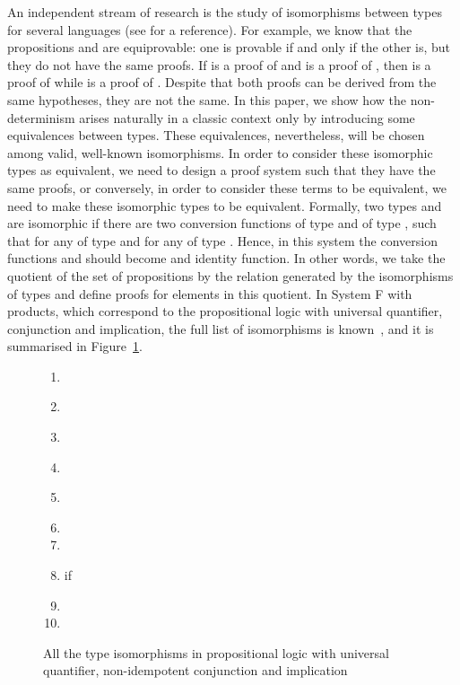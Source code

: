 \documentclass[final,copyright,creativecommons]{eptcs}
\theoremstyle{definition}
\begin{document}
An independent stream of research is the study of isomorphisms between types for several languages (see \cite{DiCosmo95} for a reference).
For example, we know that the propositions  and  are equiprovable: one is provable if and only if the other is, but they do not have the same proofs. If  is a proof of  and  is a proof of , then  is a proof of  while  is a proof of . Despite that both proofs can be derived from the same hypotheses, they are not the same.
In this paper, we show how the non-determinism arises naturally in a classic context only by introducing some equivalences between types. These equivalences, nevertheless, will be chosen among valid, well-known isomorphisms.
In order to consider these isomorphic types as equivalent, we need to design a proof system such that they have the same proofs, or conversely, in order to consider these terms to be equivalent, we need to make these isomorphic types to be equivalent. Formally, two types  and  are isomorphic if there are two conversion functions  of type  and  of type , such that  for any  of type  and  for any  of type .
Hence, in this system the conversion functions  and  should become and identity function. In other words, we take the quotient of the set of propositions by the relation generated by the isomorphisms of types and define proofs for elements in this quotient. In System F with products, which correspond to the propositional logic with universal quantifier, conjunction and implication, the full list of isomorphisms is known~\cite{DiCosmo95}, and it is summarised in Figure~\ref{fig:iso}.
\begin{figure}[!h]
\begin{multicols}{2}
 \begin{enumerate}
  \item\label{iso:comm} 
  \item\label{iso:asso} 
  \item\label{iso:distrib} 
  \item\label{iso:currying} 
  \item\label{iso:ordering} 
  \item 
  \item 
  \item  if 
  \item 
  \item 
 \end{enumerate}
\end{multicols}
 \caption{All the type isomorphisms in propositional logic with universal quantifier, non-idempotent conjunction and implication}
 \label{fig:iso}
\end{figure}
\end{document}

